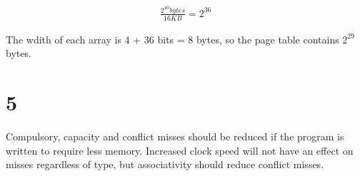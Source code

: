 \documentclass{article}
\begin{document}
\begin{align*}
\frac{2^{40} bytes}{16 KB} = 2^{36}
\end{align*}

The wdith of each array is 4 + 36 bits = 8 bytes, so the page table contains $2^{29}$ bytes.

\section*{5} 

Compulsory, capacity and conflict misses should be reduced if the program is written to require less memory. Increased clock speed will not have an effect on misses regardless of type, but associativity should reduce conflict misses.
\end{document}
